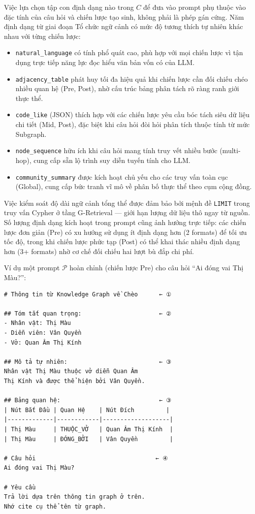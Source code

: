 Việc lựa chọn tập con định dạng nào trong $C$ để đưa vào prompt phụ thuộc vào đặc tính của câu hỏi và chiến lược tạo sinh, không phải là phép gán cứng. Năm định dạng từ giai đoạn Tổ chức ngữ cảnh có mức độ tương thích tự nhiên khác nhau với từng chiến lược:
\begin{itemize}
  \item \texttt{natural\_language} có tính phổ quát cao, phù hợp với mọi chiến lược vì tận dụng trực tiếp năng lực đọc hiểu văn bản vốn có của LLM.
  \item \texttt{adjacency\_table} phát huy tối đa hiệu quả khi chiến lược cần đối chiếu chéo nhiều quan hệ (Pre, Post), nhờ cấu trúc bảng phân tách rõ ràng ranh giới thực thể.
  \item \texttt{code\_like} (JSON) thích hợp với các chiến lược yêu cầu bóc tách siêu dữ liệu chi tiết (Mid, Post), đặc biệt khi câu hỏi đòi hỏi phân tích thuộc tính từ mức Subgraph.
  \item \texttt{node\_sequence} hữu ích khi câu hỏi mang tính truy vết nhiều bước (multi-hop), cung cấp sẵn lộ trình suy diễn tuyến tính cho LLM.
  \item \texttt{community\_summary} được kích hoạt chủ yếu cho các truy vấn toàn cục (Global), cung cấp bức tranh vĩ mô về phân bố thực thể theo cụm cộng đồng.
\end{itemize}

Việc kiểm soát độ dài ngữ cảnh tổng thể được đảm bảo bởi mệnh đề \texttt{LIMIT} trong truy vấn Cypher ở tầng G-Retrieval --- giới hạn lượng dữ liệu thô ngay từ nguồn. Số lượng định dạng kích hoạt trong prompt cũng ảnh hưởng trực tiếp: các chiến lược đơn giản (Pre) có xu hướng sử dụng ít định dạng hơn (2 formats) để tối ưu tốc độ, trong khi chiến lược phức tạp (Post) có thể khai thác nhiều định dạng hơn (3+ formats) nhờ cơ chế đối chiếu hai lượt bù đắp chi phí.

Ví dụ một prompt $\mathcal{P}$ hoàn chỉnh (chiến lược Pre) cho câu hỏi ``Ai đóng vai Thị Màu?'':

\begin{tcolorbox}[colback=gray!5, colframe=black!50, arc=4pt, boxrule=0.5pt, left=4pt, right=4pt, top=4pt, bottom=4pt]
{\small
\begin{verbatim}
# Thông tin từ Knowledge Graph về Chèo      ← ①

## Tóm tắt quan trọng:                      ← ②
- Nhân vật: Thị Màu
- Diễn viên: Vân Quyền
- Vở: Quan Âm Thị Kính

## Mô tả tự nhiên:                          ← ③
Nhân vật Thị Màu thuộc vở diễn Quan Âm
Thị Kính và được thể hiện bởi Vân Quyền.

## Bảng quan hệ:                            ← ③
| Nút Bắt Đầu | Quan Hệ    | Nút Đích         |
|-------------|------------|-------------------|
| Thị Màu     | THUỘC_VỞ   | Quan Âm Thị Kính  |
| Thị Màu     | ĐÓNG_BỞI   | Vân Quyền         |

# Câu hỏi                                  ← ④
Ai đóng vai Thị Màu?

# Yêu cầu
Trả lời dựa trên thông tin graph ở trên.
Nhớ cite cụ thể tên từ graph.
\end{verbatim}
}
\end{tcolorbox}

